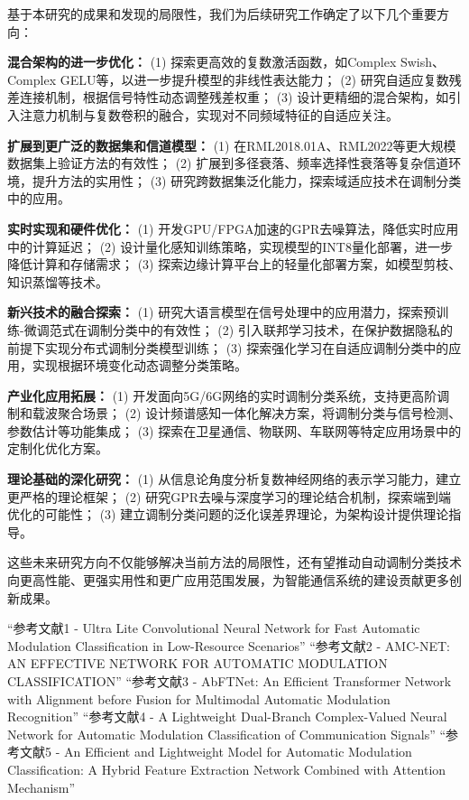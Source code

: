 \documentclass[conference]{IEEEtran}
\begin{document}
基于本研究的成果和发现的局限性，我们为后续研究工作确定了以下几个重要方向：

\textbf{混合架构的进一步优化：}
(1) 探索更高效的复数激活函数，如Complex Swish、Complex GELU等，以进一步提升模型的非线性表达能力；
(2) 研究自适应复数残差连接机制，根据信号特性动态调整残差权重；
(3) 设计更精细的混合架构，如引入注意力机制与复数卷积的融合，实现对不同频域特征的自适应关注。

\textbf{扩展到更广泛的数据集和信道模型：}
(1) 在RML2018.01A、RML2022等更大规模数据集上验证方法的有效性；
(2) 扩展到多径衰落、频率选择性衰落等复杂信道环境，提升方法的实用性；
(3) 研究跨数据集泛化能力，探索域适应技术在调制分类中的应用。

\textbf{实时实现和硬件优化：}
(1) 开发GPU/FPGA加速的GPR去噪算法，降低实时应用中的计算延迟；
(2) 设计量化感知训练策略，实现模型的INT8量化部署，进一步降低计算和存储需求；
(3) 探索边缘计算平台上的轻量化部署方案，如模型剪枝、知识蒸馏等技术。

\textbf{新兴技术的融合探索：}
(1) 研究大语言模型在信号处理中的应用潜力，探索预训练-微调范式在调制分类中的有效性；
(2) 引入联邦学习技术，在保护数据隐私的前提下实现分布式调制分类模型训练；
(3) 探索强化学习在自适应调制分类中的应用，实现根据环境变化动态调整分类策略。

\textbf{产业化应用拓展：}
(1) 开发面向5G/6G网络的实时调制分类系统，支持更高阶调制和载波聚合场景；
(2) 设计频谱感知一体化解决方案，将调制分类与信号检测、参数估计等功能集成；
(3) 探索在卫星通信、物联网、车联网等特定应用场景中的定制化优化方案。

\textbf{理论基础的深化研究：}
(1) 从信息论角度分析复数神经网络的表示学习能力，建立更严格的理论框架；
(2) 研究GPR去噪与深度学习的理论结合机制，探索端到端优化的可能性；
(3) 建立调制分类问题的泛化误差界理论，为架构设计提供理论指导。

这些未来研究方向不仅能够解决当前方法的局限性，还有望推动自动调制分类技术向更高性能、更强实用性和更广应用范围发展，为智能通信系统的建设贡献更多创新成果。


\begin{thebibliography}{00}

 ``参考文献1 - Ultra Lite Convolutional Neural Network for Fast Automatic Modulation Classification in Low-Resource Scenarios''
 ``参考文献2 - AMC-NET: AN EFFECTIVE NETWORK FOR AUTOMATIC MODULATION CLASSIFICATION''
 ``参考文献3 - AbFTNet: An Efficient Transformer Network with Alignment before Fusion for Multimodal Automatic Modulation Recognition''
 ``参考文献4 - A Lightweight Dual-Branch Complex-Valued Neural Network for Automatic Modulation Classification of Communication Signals''
 ``参考文献5 - An Efficient and Lightweight Model for Automatic Modulation Classification: A Hybrid Feature Extraction Network Combined with Attention Mechanism''

\end{thebibliography}
\end{document}
